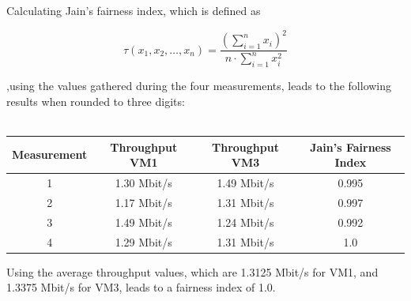 \documentclass[a4paper]{scrreprt}
\begin{document}
Calculating Jain's fairness index, which is defined as

\begin{displaymath}
	\tau(x_1, x_2, \dots, x_n) = \frac{(\sum_{i = 1}^{n} x_i)^2}{n \cdot \sum_{i = 1}^{n} x_i^2}
\end{displaymath}

,using the values gathered during the four measurements, leads to the following
results when rounded to three digits:
\\
\\
\begin{tabular}{|c|c|c|c|}
	\hline
	Measurement & Throughput VM1 & Throughput VM3 & Jain's Fairness Index \\
	\hline
	1 & 1.30 Mbit/s & 1.49 Mbit/s & 0.995 \\
	2 & 1.17 Mbit/s & 1.31 Mbit/s & 0.997 \\
	3 & 1.49 Mbit/s & 1.24 Mbit/s & 0.992 \\
	4 & 1.29 Mbit/s & 1.31 Mbit/s & 1.0 \\
	\hline
\end{tabular}

Using the average throughput values, which are 1.3125 Mbit/s for VM1, and
1.3375 Mbit/s for VM3, leads to a fairness index of 1.0.
\end{document}
